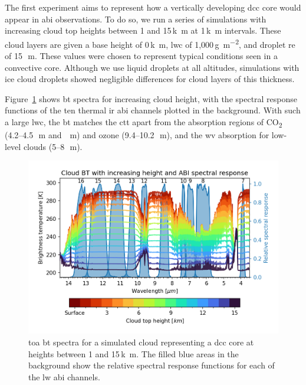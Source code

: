The first experiment aims to represent how a vertically developing \acrshort{dcc} core would appear in \acrshort{abi} observations.
To do so, we run a series of simulations with increasing cloud top heights between 1 and 15\,\unit{k m} at 1\,\unit{k m} intervals.
These cloud layers are given a base height of 0\,\unit{k m}, \acrshort{lwc} of 1,000\,\unit{g m^{-2}}, and droplet \acrshort{re} of 15\,\unit{\mu m}.
These values were chosen to represent typical conditions seen in a convective core.
Although we use liquid droplets at all altitudes, simulations with ice cloud droplets showed negligible differences for cloud layers of this thickness.

Figure~\ref{fig:cloud_height_spectra} shows \acrshort{bt} spectra for increasing cloud height, with the spectral response functions of the ten thermal \acrshort{ir} \acrshort{abi} channels plotted in the background.
With such a large \acrshort{lwc}, the \acrshort{bt} matches the \acrshort{ctt} apart from the absorption regions of CO\textsubscript{2} (4.2--4.5\,\unit{\mu m} and \,\unit{\mu m}) and ozone (9.4--10.2\,\unit{\mu m}), and the \acrshort{wv} absorption for low-level clouds (5--8\,\unit{\mu m}).


\begin{figure}[tp]
    \includegraphics[width=\textwidth]{figures/chapter1_05.png}
    \caption[
    \acrshort{toa} \acrshort{bt} spectra for a simulated cloud representing a \acrshort{dcc} core at heights between 1 and 15\,\unit{k m}
    ]{
    \acrshort{toa} \acrshort{bt} spectra for a simulated cloud representing a \acrshort{dcc} core at heights between 1 and 15\,\unit{k m}. The filled blue areas in the background show the relative spectral response functions for each of the \acrshort{lw} \acrshort{abi} channels.
    }
    \label{fig:cloud_height_spectra}
\end{figure}


